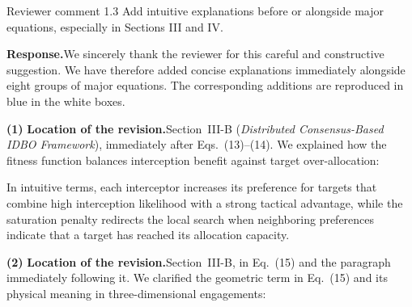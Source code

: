 \documentclass[11pt]{article}
\newcommand{\hladd}[1]{{\color{addblue}#1}}
\newcommand{\rsp}{\medskip\noindent\textbf{Response.}\quad}
\newcommand{\loc}{\medskip\noindent\textbf{Location of the revision.}\quad}
\begin{document}
\begin{reviewercomment}{Reviewer comment 1.3}
Add intuitive explanations before or alongside major equations, especially
in Sections III and IV.
\end{reviewercomment}

\rsp We sincerely thank the reviewer for this careful and constructive
suggestion. We have therefore added concise
explanations immediately alongside eight groups of major equations. The corresponding
additions are reproduced in blue in the white boxes.

\medskip
\noindent\textbf{(1)}
\loc Section~III-B (\emph{Distributed Consensus-Based IDBO Framework}),
immediately after Eqs.~(13)--(14). We explained how the fitness function
balances interception benefit against target over-allocation:

\begin{tcolorbox}[enhanced,breakable,colback=white,colframe=addblue!55,
boxrule=0.6pt,arc=2pt,left=9pt,right=9pt,top=7pt,bottom=7pt]
\hladd{In intuitive terms, each interceptor increases its preference
for targets that combine high interception likelihood with a strong
tactical advantage, while the saturation penalty redirects the local search
when neighboring preferences indicate that a target has reached its
allocation capacity.}
\end{tcolorbox}

\medskip
\noindent\textbf{(2)}
\loc Section~III-B, in Eq.~(15) and the paragraph immediately following it.
We clarified the geometric term in Eq.~(15) and its physical meaning in
three-dimensional engagements:
\end{document}
